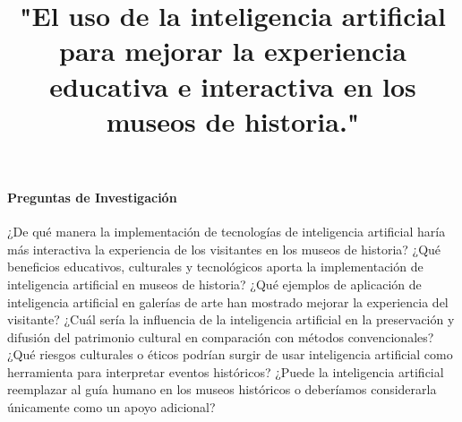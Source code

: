 \documentclass[pdflatex,sn-mathphys-num]{sn-jnl}%
\theoremstyle{thmstyleone}%
\theoremstyle{thmstyletwo}%
\theoremstyle{thmstylethree}%
\begin{document}
\title[Article Title]{"El uso de la inteligencia artificial para mejorar la experiencia educativa e interactiva en los museos de historia."}


\author*[1,2]{ }

\author[2,3]{ }






\paragraph{Preguntas de Investigación} 
¿De qué manera la implementación de tecnologías de inteligencia artificial haría más interactiva la experiencia de los visitantes en los museos de historia?\newline
¿Qué beneficios educativos, culturales y tecnológicos aporta la implementación de inteligencia artificial en museos de historia?\newline
¿Qué ejemplos de aplicación de inteligencia artificial en galerías de arte han mostrado mejorar la experiencia del visitante?\newline
¿Cuál sería la influencia de la inteligencia artificial en la preservación y difusión del patrimonio cultural en comparación con métodos convencionales?\newline
¿Qué riesgos culturales o éticos podrían surgir de usar inteligencia artificial como herramienta para interpretar eventos históricos?\newline
¿Puede la inteligencia artificial reemplazar al guía humano en los museos históricos o deberíamos considerarla únicamente como un apoyo adicional?\newline
\end{document}
